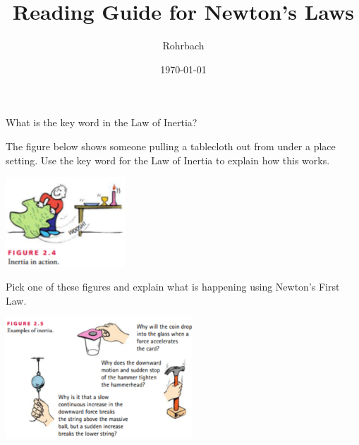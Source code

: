 \documentclass[10pt]{exam}
\title{Reading Guide for Newton's Laws}
\author{Rohrbach}
\date{\today}
\begin{document}
\maketitle

\vspace{-2em}

\begin{questions}
  

\question
  What is the key word in the Law of Inertia?
  \vs

\question
  The figure below shows someone pulling a tablecloth out from under a place setting.  Use the key word for the Law of Inertia to explain how this works.

  \includegraphics[width=4.5cm]{images/2-4.png}
  \vs
  
\question
  Pick one of these figures and explain what is happening using Newton's First Law.

  \includegraphics[width=7cm]{images/2-5.png}
  \vs

\end{questions}
\end{document}
